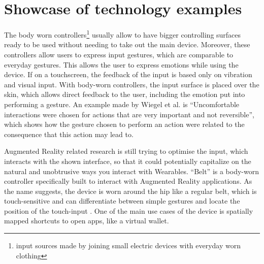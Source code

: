 \documentclass{sigchi}
\begin{document}
\section{Showcase of technology examples}
%
The body worn controllers\footnote{input sources made by joining small electric devices with everyday worn clothing} %
usually allow to have bigger controlling surfaces ready to be used without needing to take out the main device. Moreover, these controllers allow users to express input gestures, which are comparable to everyday gestures. This allows the user to express emotions while using the device. If on a touchscreen, the feedback of the input is based only on vibration and visual input. With body-worn controllers, the input surface is placed over the skin, which allows direct feedback to the user, including the emotion put into performing a gesture. An example made by Wiegel et al. %
\cite[p.185]{more-touch} is “Uncomfortable interactions were chosen for actions that are very important and not reversible”, which shows how the gesture chosen to perform an action were related to the consequence that this action may lead to.


Augmented Reality related research is still trying to optimise the input, which interacts with the shown interface, so that it could potentially capitalize on the natural and unobtrusive ways you interact with Wearables.
``Belt'' \cite{belt} is a body-worn controller specifically built to interact with Augmented Reality applications. As the name suggests, the device is worn around the hip like a regular belt, which is touch-sensitive and can differentiate between simple gestures and locate the position of the touch-input \cite[p. 2136]{belt}.%
 One of the main use cases of the device is spatially mapped shortcuts to open apps, like a virtual wallet. \cite{belt}
\end{document}
